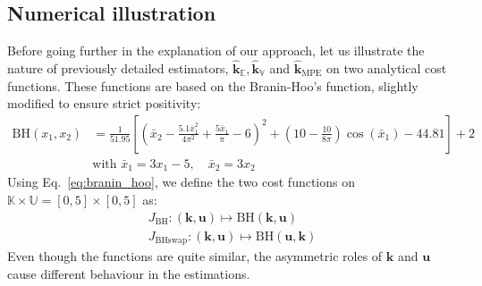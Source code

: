 \documentclass[preprint, 1p]{elsarticle}
\newcommand{\Ex}{\mathbb{E}}
\newcommand{\hatkmean}{\hat{\mathbf{k}}_{\Ex}}
\newcommand{\hatkvar}{\hat{\mathbf{k}}_{\mathbb{V}}}
\newcommand{\hatkmpe}{\hat{\mathbf{k}}_{\mathrm{MPE}}}
\newcommand{\Kspace}{\mathbb{K}}
\newcommand{\Uspace}{\mathbb{U}}
\newcommand{\JBH}{J_{\mathrm{BH}}}
\newcommand{\JBHS}{J_{\mathrm{BHswap}}}
\begin{document}
\subsection{Numerical illustration}
\label{ssec:num_illu}
Before going further in the explanation of our approach, let us illustrate the nature of previously detailed estimators, $\hatkmean, \hatkvar$ and $\hatkmpe$ on two analytical cost functions. These functions are based on the Branin-Hoo's function, slightly modified to ensure strict positivity:
\begin{align}
  \label{eq:branin_hoo}
 \mathrm{BH}(x_1,x_2) &= \frac{1}{51.95}\left[\left(\bar{x}_2 - \frac{5.1 \bar{x}_1^2}{4\pi^2} + \frac{5\bar{x}_1}{\pi} -6 \right)^2 + \left(10 - \frac{10}{8\pi}\right)\cos(\bar{x}_1)-44.81\right]+2\\
&\text{with } \bar{x}_1 = 3x_1-5,\quad \bar{x}_2 = 3x_2
\end{align}
%
Using Eq.~\eqref{eq:branin_hoo}, we define the two cost functions on $\Kspace \times \Uspace = [0,5] \times [0,5]$ as:
\begin{align*} \JBH : (\mathbf{k},\mathbf{u}) \mapsto \mathrm{BH}(\mathbf{k},\mathbf{u}) \\
\JBHS : (\mathbf{k},\mathbf{u}) \mapsto \mathrm{BH}(\mathbf{u},\mathbf{k})
\end{align*}
Even though the functions are quite similar, the asymmetric roles of $\mathbf{k}$ and $\mathbf{u}$ cause different behaviour in the estimations.
\end{document}
